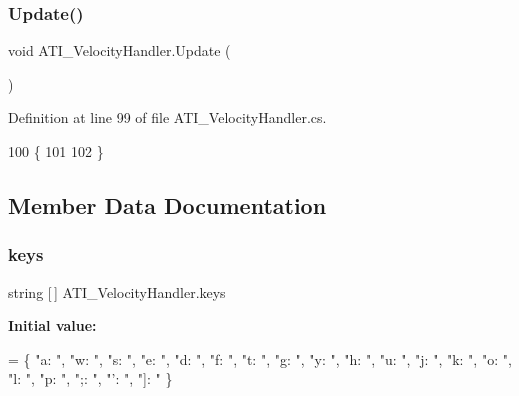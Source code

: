 \mbox{\label{class_a_t_i___velocity_handler_aa5766a74ea02f8e1d789a3863ce5867b}} 
\subsubsection{\texorpdfstring{Update()}{Update()}}
{\footnotesize\ttfamily void A\+T\+I\+\_\+\+Velocity\+Handler.\+Update (\begin{DoxyParamCaption}{ }\end{DoxyParamCaption})\hspace{0.3cm}{\ttfamily [private]}}



Definition at line 99 of file A\+T\+I\+\_\+\+Velocity\+Handler.\+cs.


\begin{DoxyCode}
100     \{
101 
102     \}
\end{DoxyCode}


\subsection{Member Data Documentation}
\mbox{\label{class_a_t_i___velocity_handler_a95a1abb133981ac42dce424f0f94d562}} 
\subsubsection{\texorpdfstring{keys}{keys}}
{\footnotesize\ttfamily string \mbox{[}$\,$\mbox{]} A\+T\+I\+\_\+\+Velocity\+Handler.\+keys\hspace{0.3cm}{\ttfamily [private]}}

{\bfseries Initial value\+:}
\begin{DoxyCode}
=
        \{ \textcolor{stringliteral}{"a: "}, \textcolor{stringliteral}{"w: "}, \textcolor{stringliteral}{"s: "}, \textcolor{stringliteral}{"e: "}, \textcolor{stringliteral}{"d: "}, \textcolor{stringliteral}{"f: "}, \textcolor{stringliteral}{"t: "}, \textcolor{stringliteral}{"g: "}, \textcolor{stringliteral}{"y: "}, \textcolor{stringliteral}{"h: "}, \textcolor{stringliteral}{"u: "}, \textcolor{stringliteral}{"j: "}, \textcolor{stringliteral}{"k: "}, \textcolor{stringliteral}{"o: "},
       \textcolor{stringliteral}{"l: "}, \textcolor{stringliteral}{"p: "}, \textcolor{stringliteral}{";: "}, \textcolor{stringliteral}{"': "}, \textcolor{stringliteral}{"]: "} \}
\end{DoxyCode}


